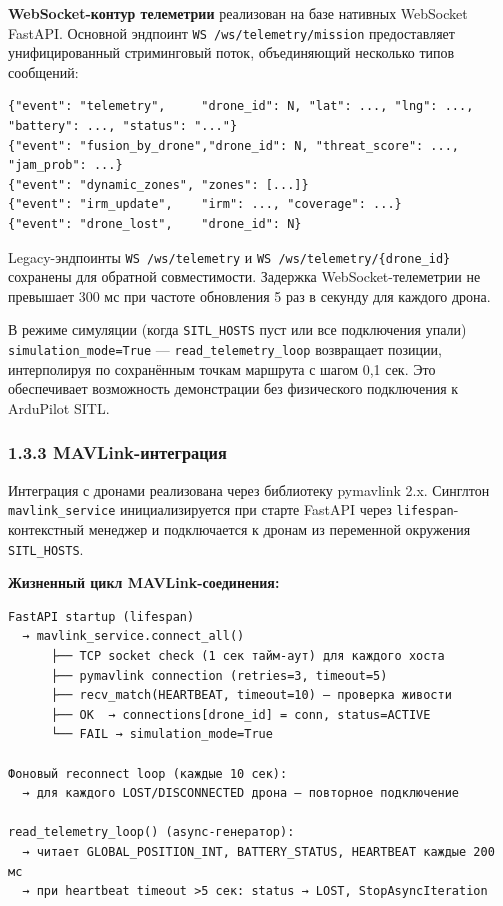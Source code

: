 \textbf{WebSocket-контур телеметрии} реализован на базе нативных WebSocket FastAPI. Основной эндпоинт \texttt{WS\ /ws/telemetry/mission} предоставляет унифицированный стриминговый поток, объединяющий несколько типов сообщений:

\begin{verbatim}
{"event": "telemetry",     "drone_id": N, "lat": ..., "lng": ..., "battery": ..., "status": "..."}
{"event": "fusion_by_drone","drone_id": N, "threat_score": ..., "jam_prob": ...}
{"event": "dynamic_zones", "zones": [...]}
{"event": "irm_update",    "irm": ..., "coverage": ...}
{"event": "drone_lost",    "drone_id": N}
\end{verbatim}

Legacy-эндпоинты \texttt{WS\ /ws/telemetry} и \texttt{WS\ /ws/telemetry/\{drone\_id\}} сохранены для обратной совместимости. Задержка WebSocket-телеметрии не превышает 300 мс при частоте обновления 5 раз в секунду для каждого дрона.

В режиме симуляции (когда \texttt{SITL\_HOSTS} пуст или все подключения упали) \texttt{simulation\_mode=True} --- \texttt{read\_telemetry\_loop} возвращает позиции, интерполируя по сохранённым точкам маршрута с шагом 0,1 сек. Это обеспечивает возможность демонстрации без физического подключения к ArduPilot SITL.

\hypertarget{mavlink-ux438ux43dux442ux435ux433ux440ux430ux446ux438ux44f}{%
\subsubsection{1.3.3 MAVLink-интеграция}\label{mavlink-ux438ux43dux442ux435ux433ux440ux430ux446ux438ux44f}}

Интеграция с дронами реализована через библиотеку pymavlink 2.x. Синглтон \texttt{mavlink\_service} инициализируется при старте FastAPI через \texttt{lifespan}-контекстный менеджер и подключается к дронам из переменной окружения \texttt{SITL\_HOSTS}.

\textbf{Жизненный цикл MAVLink-соединения:}

\begin{verbatim}
FastAPI startup (lifespan)
  → mavlink_service.connect_all()
      ├── TCP socket check (1 сек тайм-аут) для каждого хоста
      ├── pymavlink connection (retries=3, timeout=5)
      ├── recv_match(HEARTBEAT, timeout=10) — проверка живости
      ├── OK  → connections[drone_id] = conn, status=ACTIVE
      └── FAIL → simulation_mode=True

Фоновый reconnect loop (каждые 10 сек):
  → для каждого LOST/DISCONNECTED дрона — повторное подключение

read_telemetry_loop() (async-генератор):
  → читает GLOBAL_POSITION_INT, BATTERY_STATUS, HEARTBEAT каждые 200 мс
  → при heartbeat timeout >5 сек: status → LOST, StopAsyncIteration
\end{verbatim}

